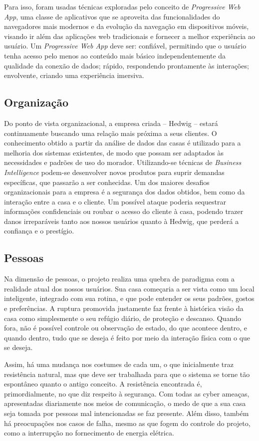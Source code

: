 Para isso, foram usadas técnicas exploradas pelo conceito de \emph{Progressive Web App}, uma classe de aplicativos que se aproveita das funcionalidades do navegadores mais modernos e da evolução da navegação em dispositivos móveis, visando ir além das aplicações web tradicionais e fornecer a melhor experiência ao usuário. Um \emph{Progressive Web App} deve ser: confiável, permitindo que o usuário tenha acesso pelo menos ao conteúdo mais básico independentemente da qualidade da conexão de dados; rápido, respondendo prontamente às interações; envolvente, criando uma experiência imersiva.

\subsection{Organização}

Do ponto de vista organizacional, a empresa criada -- Hedwig -- estará continuamente buscando uma relação mais próxima a seus clientes. O conhecimento obtido a partir da análise de dados das casas é utilizado para a melhoria dos sistemas existentes, de modo que possam ser adaptados às necessidades e padrões de uso do morador. Utilizando-se técnicas de \emph{Business Intelligence} podem-se desenvolver novos produtos para suprir demandas específicas, que passarão a ser conhecidas. Um dos maiores desafios organizacionais para a empresa é a segurança dos dados obtidos, bem como da interação entre a casa e o cliente. Um possível ataque poderia sequestrar informações confidenciais ou roubar o acesso do cliente à casa, podendo trazer danos irreparáveis tanto aos nossos usuários quanto à Hedwig, que perderá a confiança e o prestígio.

\subsection{Pessoas}

Na dimensão de pessoas, o projeto realiza uma quebra de paradigma com a realidade atual dos nossos usuários. Sua casa começaria a ser vista como um local inteligente, integrado com sua rotina, e que pode entender os seus padrões, gostos e preferências. A ruptura promovida justamente faz frente à histórica visão da casa como simplesmente o seu refúgio diário, de proteção e descanso. Quando fora, não é possível controle ou observação de estado, do que acontece dentro, e quando dentro, tudo que se deseja é feito por meio da interação física com o que se deseja.

Assim, há uma mudança nos costumes de cada um, o que inicialmente traz resistência natural, mas que deve ser trabalhada para que o sistema se torne tão espontâneo quanto o antigo conceito. A resistência encontrada é, primordialmente, no que diz respeito à segurança. Com todas as cyber ameaças, apresentadas diariamente nos meios de comunicação, o medo de que a sua casa seja tomada por pessoas mal intencionadas se faz presente. Além disso, também há preocupações nos casos de falha, mesmo as que fogem do controle do projeto, como a interrupção no fornecimento de energia elétrica.

